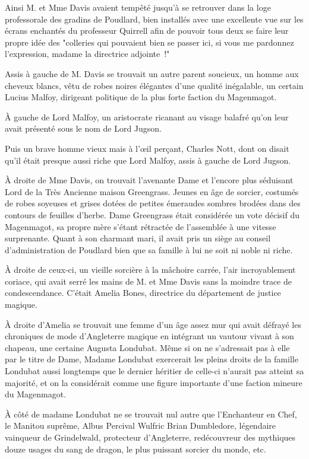 Ainsi M. et Mme Davis avaient tempêté jusqu'à se retrouver dans la loge professorale des gradins de Poudlard, bien installés avec une excellente vue sur les écrans enchantés du professeur Quirrell afin de pouvoir tous deux se faire leur propre idée des "colleries qui pouvaient bien se passer ici, si vous me pardonnez l'expression, madame la directrice adjointe~!"

Assis à gauche de M. Davis se trouvait un autre parent soucieux, un homme aux cheveux blancs, vêtu de robes noires élégantes d'une qualité inégalable, un certain Lucius Malfoy, dirigeant politique de la plus forte faction du Magenmagot.

À gauche de Lord Malfoy, un aristocrate ricanant au visage balafré qu'on leur avait présenté sous le nom de Lord Jugson.

Puis un brave homme vieux mais à l'œil perçant, Charles Nott, dont on disait qu'il était presque aussi riche que Lord Malfoy, assis à gauche de Lord Jugson.

À droite de Mme Davis, on trouvait l'avenante Dame et l'encore plus séduisant Lord de la Très Ancienne maison Greengrass. Jeunes en âge de sorcier, costumés de robes soyeuses et grises dotées de petites émeraudes sombres brodées dans des contours de feuilles d'herbe. Dame Greengrass était considérée un vote décisif du Magenmagot, sa propre mère s'étant rétractée de l'assemblée à une vitesse surprenante. Quant à son charmant mari, il avait pris un siège au conseil d'administration de Poudlard bien que sa famille à lui ne soit ni noble ni riche.

À droite de ceux-ci, un vieille sorcière à la mâchoire carrée, l'air incroyablement coriace, qui avait serré les mains de M. et Mme Davis sans la moindre trace de condescendance. C'était Amelia Bones, directrice du département de justice magique.

À droite d'Amelia se trouvait une femme d'un âge assez mur qui avait défrayé les chroniques de mode d'Angleterre magique en intégrant un vautour vivant à son chapeau, une certaine Augusta Londubat. Même si on ne s'adressait pas à elle par le titre de Dame, Madame Londubat exercerait les pleins droits de la famille Londubat aussi longtemps que le dernier héritier de celle-ci n'aurait pas atteint sa majorité, et on la considérait comme une figure importante d'une faction mineure du Magenmagot.

À côté de madame Londubat ne se trouvait nul autre que l'Enchanteur en Chef, le Manitou suprême, Albus Percival Wulfric Brian Dumbledore, légendaire vainqueur de Grindelwald, protecteur d'Angleterre, redécouvreur des mythiques douze usages du sang de dragon, le plus puissant sorcier du monde, etc.

